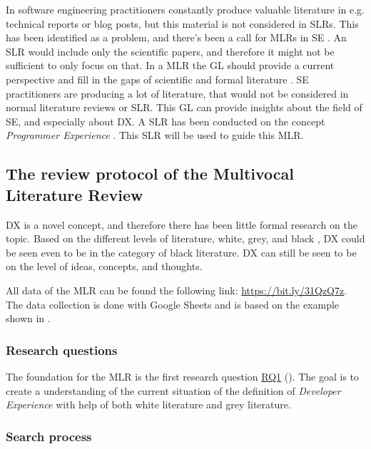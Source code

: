 \documentclass[english, 12pt, a4paper, sci, utf8, a-1b, online]{aaltothesis}
\begin{document}
In software engineering practitioners constantly produce valuable literature in e.g. technical reports or blog posts, but this material is not considered in SLRs. This has been identified as a problem, and there's been a call for MLRs in SE \citep{the-need-for-MLR}. An SLR would include only the scientific papers, and therefore it might not be sufficient to only focus on that. In a MLR the GL should provide a current perspective and fill in the gaps of scientific and formal literature \citep{guidelines-for-MLR}. SE practitioners are producing a lot of literature, that would not be considered in normal literature reviews or SLR. This GL can provide insights about the field of SE, and especially about DX. A SLR has been conducted on the concept \textit{Programmer Experience} \citep{programmer-experience}. This SLR will be used to guide this MLR.


\subsection{The review protocol of the Multivocal Literature Review}

DX is a novel concept, and therefore there has been little formal research on the topic. Based on the different levels of literature, white, grey, and black \citep{guidelines-for-MLR}, DX could be seen even to be in the category of black literature. DX can still be seen to be on the level of ideas, concepts, and thoughts.

\newcommand{\mlrdxlink}{https://bit.ly/31QzQ7z}

All data of the MLR can be found the following link: \href{\mlrdxlink}{https://bit.ly/31QzQ7z}. The data collection is done with Google Sheets and is based on the example shown in \citep{guidelines-for-MLR}.

\subsubsection{Research questions}

The foundation for the MLR is the first research question \hyperref[RQ1]{RQ1} (\rqone). The goal is to create a understanding of the current situation of the definition of \textit{Developer Experience} with help of both white literature and grey literature.

\subsubsection{Search process}
\end{document}
